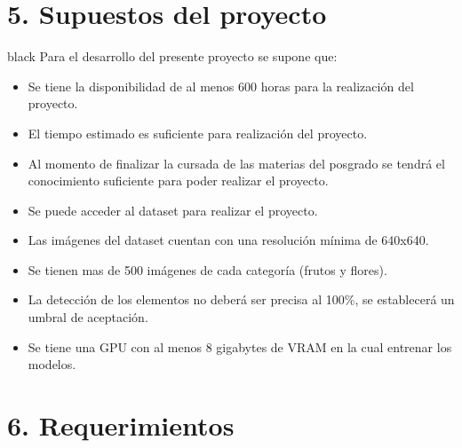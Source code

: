 \documentclass[
11pt, %
]{charter}
\begin{document}
\section{5. Supuestos del proyecto}
\label{sec:supuestos}

\begin{consigna}{black}
Para el desarrollo del presente proyecto se supone que: 

\begin{itemize}
	\item Se tiene la disponibilidad de al menos 600 horas para la realización del proyecto.
	\item El tiempo estimado es suficiente para realización del proyecto.
	\item Al momento de finalizar la cursada de las materias del posgrado se tendrá el conocimiento suficiente para poder realizar el proyecto.
	\item Se puede acceder al dataset para realizar el proyecto.
	\item Las imágenes del dataset cuentan con una resolución mínima de 640x640.
	\item Se tienen mas de 500 imágenes de cada categoría (frutos y flores).
	\item La detección de los elementos no deberá ser precisa al 100\%, se establecerá un umbral de aceptación.
	\item Se tiene una GPU con al menos 8 gigabytes de VRAM en la cual entrenar los modelos. 
\end{itemize}
\end{consigna}

\section{6. Requerimientos}
\label{sec:requerimientos}
\end{document}
